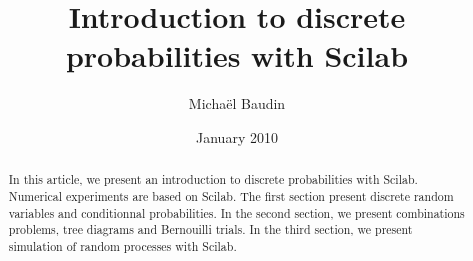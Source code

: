\documentclass[12pt]{article}
\begin{document}
\author{Micha\"el Baudin}
\date{January 2010}
\title{Introduction to discrete probabilities with Scilab}

\maketitle

\begin{abstract}
In this article, we present an introduction to discrete probabilities with Scilab.
Numerical experiments are based on Scilab.
The first section present discrete random variables and 
conditionnal probabilities. In the second section, we present combinations problems,  
tree diagrams and Bernouilli trials. In the third section, we present simulation
of random processes with Scilab. 
\end{abstract}

\tableofcontents







\printindex
\end{document}
